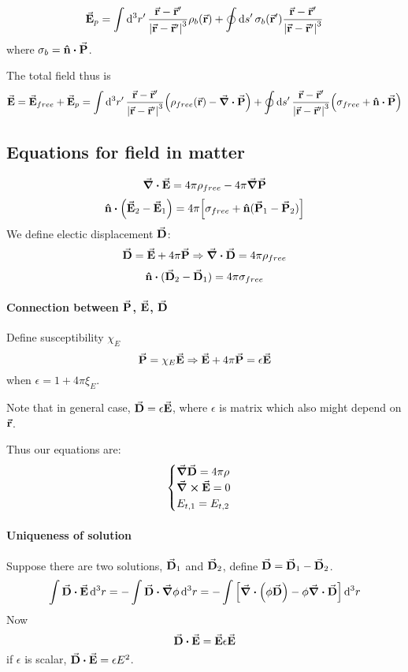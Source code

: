 $$\va{E}_p = \int \dd[3]{r'}  \frac{\va{r}-\va{r}'}{\abs{\va{r}-\va{r}'}^3} \rho_b(\va{r}) + \oint \dd{s'}  \sigma_b (\va{r}') \frac{\va{r}-\va{r}'}{\abs{\va{r}-\va{r}'}^3}  $$
where $\sigma_b = \vu{n} \vdot \va{P}$.

The total field thus is
$$\va{E} = \va{E}_{free} + \va{E}_p = \int \dd[3]{r'}  \frac{\va{r}-\va{r}'}{\abs{\va{r}-\va{r}'}^3} \qty(\rho_{free}(\va{r}) - \div{\va{P}}) + \oint \dd{s'}  \frac{\va{r}-\va{r}'}{\abs{\va{r}-\va{r}'}^3} \qty(\sigma_{free} + \vu{n} \vdot \va{P})$$

\subsection{Equations for field in matter}
$$\div{\va{E}} = 4\pi \rho_{free} - 4\pi \grad{\va{P}}$$
$$\vu{n}\vdot \qty(\va{E}_2-\va{E}_1) = 4\pi \qty[\sigma_{free} + \vu{n}(\va{P}_1-\va{P}_2) ]$$
We define electic displacement $\va{D}$:
$$\va{D} = \va{E} + 4\pi \va{P} \Rightarrow \div{\va{D}} = 4\pi \rho_{free}$$
$$\vu{n} \vdot (\va{D}_2 - \va{D}_1) = 4\pi \sigma_{free}$$

\paragraph{Connection between $\va{P}$, $\va{E}$, $\va{D}$}
Define susceptibility $\chi_E$
$$\va{P} = \chi_E\va{E} \Rightarrow \va{E} + 4\pi \va{P} = \epsilon \va{E}$$
when $\epsilon = 1+4\pi \xi_E$.

Note that in general case, $\va{D} = \epsilon \va{E}$, where $\epsilon$ is matrix which also might depend on $\va{r}$.

Thus our equations are:
$$\begin{cases}
\grad{\va{D}} = 4\pi \rho\\
\curl{\va{E}} = 0\\
E_{t,1}=E_{t,2}
\end{cases}$$

\paragraph{Uniqueness of solution}
Suppose there are two solutions, $\va{D}_1$ and $\va{D}_2$, define $\va{D} = \va{D}_1-\va{D}_2$.
$$\int \va{D}\vdot \va{E} \dd[3]{r} = -\int \va{D} \vdot \grad{\phi} \dd[3]{r} = - \int \qty[ \div(\phi\va{D}) - \phi \div{\va{D}}] \dd[3]{r}$$
Now
$$\va{D} \vdot \va{E} = \va{E} \epsilon \va{E}$$
if $\epsilon$ is scalar, $\va{D} \vdot \va{E} = \epsilon E^2$.

